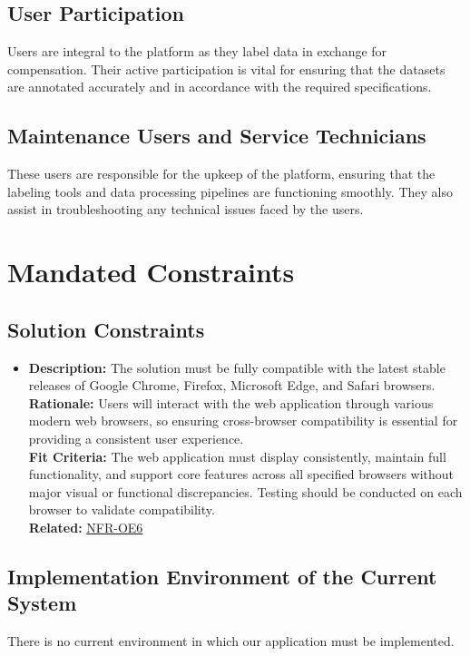 \documentclass[12pt]{article}
\begin{document}
\subsection{User Participation}
Users are integral to the platform as they label data in exchange for compensation. Their active participation is vital for ensuring that the datasets are annotated accurately and in accordance with the required specifications.

\subsection{Maintenance Users and Service Technicians}
These users are responsible for the upkeep of the platform, ensuring that the labeling tools and data processing pipelines are functioning smoothly. They also assist in troubleshooting any technical issues faced by the users.

\newpage
\section{Mandated Constraints}
\subsection{Solution Constraints}
\begin{itemize}
  \item \textbf{Description:} The solution must be fully compatible with the latest stable releases of Google Chrome, Firefox, Microsoft Edge, and Safari browsers.\\ \textbf{Rationale:} Users will interact with the web application through various modern web browsers, so ensuring cross-browser compatibility is essential for providing a consistent user experience. \\ \textbf{Fit Criteria:} The web application must display consistently, maintain full functionality, and support core features across all specified browsers without major visual or functional discrepancies. Testing should be conducted on each browser to validate compatibility. \\ \textbf{Related:}  \hyperref[sec:OE6]{NFR-OE6}
\end{itemize}
\subsection{Implementation Environment of the Current System}
There is no current environment in which our application must be implemented.
\end{document}
